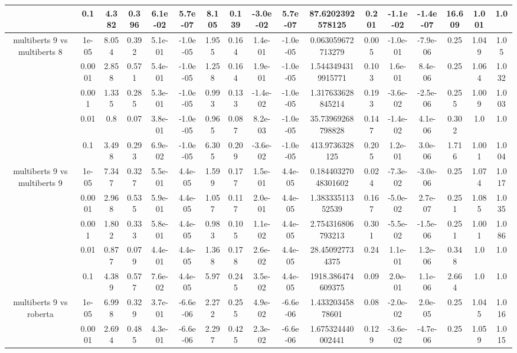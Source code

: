 \begin{tabular}{|c|c|c|c|c|c|c|c|c|c|c|c|c|c|c|c|c|}
 & 0.1 & 4.382 & 0.396 & 6.1e-02 & 5.7e-07 & 8.105 & 0.139 & -3.0e-02 & 5.7e-07 & 87.6202392578125 & 0.201 & -1.1e-02 & -1.4e-07 & 16.609 & 1.001 & 1.0 \\
\hline
\multirow{5}{*}{multiberts 9 vs multiberts 8} & 1e-05 & 8.054 & 0.392 & 5.1e-01 & -1.0e-05 & 1.955 & 0.164 & 1.4e-01 & -1.0e-05 & 0.063059672713279 & 0.005 & -1.0e-01 & -7.9e-06 & 0.25 & 1.049 & 1.05 \\
 & 0.0001 & 2.858 & 0.571 & 5.4e-01 & -1.0e-05 & 1.258 & 0.164 & 1.9e-01 & -1.0e-05 & 1.5443494319915771 & 0.103 & 1.6e-01 & 8.4e-06 & 0.25 & 1.064 & 1.032 \\
 & 0.001 & 1.335 & 0.285 & 5.3e-01 & -1.0e-05 & 0.993 & 0.133 & -1.4e-02 & -1.0e-05 & 1.317633628845214 & 0.193 & -3.6e-02 & -2.5e-06 & 0.255 & 1.009 & 1.003 \\
 & 0.01 & 0.8 & 0.07 & 3.8e-01 & -1.0e-05 & 0.965 & 0.087 & 8.2e-03 & -1.0e-05 & 35.73969268798828 & 0.147 & -1.4e-02 & 4.1e-06 & 0.302 & 1.0 & 1.0 \\
 & 0.1 & 3.498 & 0.293 & 6.9e-02 & -1.0e-05 & 6.305 & 0.209 & -3.6e-02 & -1.0e-05 & 413.9736328125 & 0.205 & 1.2e-01 & 3.0e-06 & 1.716 & 1.001 & 1.004 \\
\hline
\multirow{5}{*}{multiberts 9 vs multiberts 9} & 1e-05 & 7.347 & 0.327 & 5.5e-01 & 4.4e-05 & 1.599 & 0.177 & 1.5e-01 & 4.4e-05 & 0.18440327048301602 & 0.024 & -7.3e-02 & -3.0e-06 & 0.25 & 1.074 & 1.017 \\
 & 0.0001 & 2.968 & 0.535 & 5.9e-01 & 4.4e-05 & 1.057 & 0.117 & 2.0e-01 & 4.4e-05 & 1.38333511352539 & 0.167 & -5.0e-02 & 2.7e-07 & 0.251 & 1.085 & 1.035 \\
 & 0.001 & 1.802 & 0.333 & 5.8e-01 & 4.4e-05 & 0.983 & 0.105 & 1.1e-02 & 4.4e-05 & 2.754316806793213 & 0.301 & -5.5e-02 & -1.5e-06 & 0.251 & 1.001 & 1.086 \\
 & 0.01 & 0.877 & 0.079 & 4.4e-01 & 4.4e-05 & 1.368 & 0.178 & 2.6e-02 & 4.4e-05 & 28.450927734375 & 0.24 & 1.1e-01 & 1.2e-06 & 0.348 & 1.0 & 1.0 \\
 & 0.1 & 4.389 & 0.577 & 7.6e-02 & 4.4e-05 & 5.97 & 0.245 & 3.5e-02 & 4.4e-05 & 1918.386474609375 & 0.09 & 2.0e-01 & 1.1e-06 & 2.664 & 1.0 & 1.0 \\
\hline
\multirow{5}{*}{multiberts 9 vs roberta } & 1e-05 & 6.998 & 0.329 & 3.7e-01 & -6.6e-06 & 2.272 & 0.255 & 4.9e-02 & -6.6e-06 & 1.43320345878601 & 0.08 & -2.0e-02 & 2.0e-05 & 0.25 & 1.045 & 1.016 \\
 & 0.0001 & 2.694 & 0.485 & 4.3e-01 & -6.6e-06 & 2.297 & 0.425 & 2.3e-02 & -6.6e-06 & 1.675324440002441 & 0.129 & -3.6e-02 & -4.7e-06 & 0.25 & 1.059 & 1.015 \\

\end{tabular}

